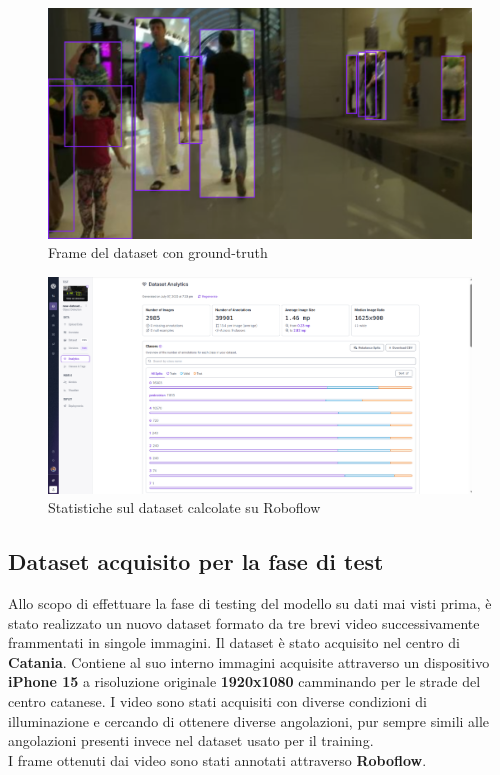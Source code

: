 \documentclass[12pt]{article}
\begin{document}
\begin{figure}[H]
    \centering
    \includegraphics[width=1.00\textwidth]{./img/dataset-ground-truth.png}
    \caption{Frame del dataset con ground-truth}
    \label{fig:dataset-frame-2}
\end{figure}

\begin{figure}[H]
    \centering
    \includegraphics[width=1.0\textwidth]{./img/roboflow-dataset.png}
    \caption{Statistiche sul dataset calcolate su Roboflow}
    \label{fig:roboflow-dataset}
\end{figure}

\subsection{Dataset acquisito per la fase di test}
Allo scopo di effettuare la fase di testing del modello su dati mai visti prima, è stato realizzato un nuovo dataset formato da tre brevi video successivamente frammentati in singole immagini. Il dataset è stato acquisito nel centro di \textbf{Catania}. Contiene al suo interno immagini acquisite attraverso un dispositivo \textbf{iPhone 15} a risoluzione originale \textbf{1920x1080} camminando per le strade del centro catanese. I video sono stati acquisiti con diverse condizioni di illuminazione e cercando di ottenere diverse angolazioni, pur sempre simili alle angolazioni presenti invece nel dataset usato per il training. \\
I frame ottenuti dai video sono stati annotati attraverso \textbf{Roboflow}.
\end{document}
